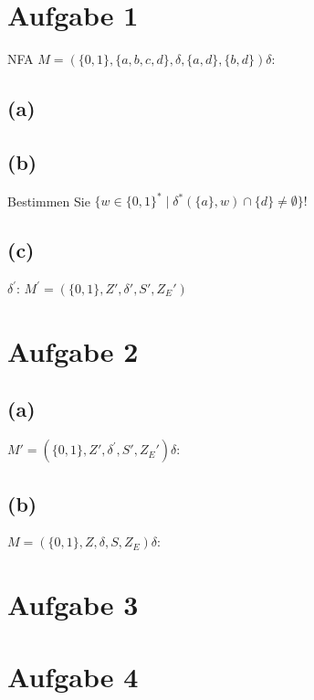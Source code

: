 \documentclass[titlepage]{article}
\renewcommand{\]}{\right]}
\renewcommand{\[}{\left[}
\renewcommand{\)}{\right)}
\renewcommand{\(}{\left(}
\renewcommand{\|}{\;|\;}
\renewcommand{\l}{\linebreak}
\begin{document}
\begingroup\let\clearpage\relax
	
	
	\section*{Aufgabe 1}
		\tab NFA $M=(\{0,1\},\{a,b,c,d\},\delta,\{a,d\},\{b,d\})$\tab$\delta$:\l
		\begin{center}
			
			
		\end{center}
		\subsection*{(a)}
			
			
		\subsection*{(b)}Bestimmen Sie $\{w\in\{0,1\}^*\mid\delta^*(\{a\},w)\cap\{d\}\neq\emptyset\}!$
			
			
		\subsection*{(c)}
		\begin{center}
			
			$\delta^{'}$:\l
			\l
			$M^{'}=(\{0,1\},Z',\delta',S',Z_E')$
		\end{center}
	\section*{Aufgabe 2}
	\subsection*{(a)}
		\tab$M'=(\{0,1\},Z',\delta^{'},S',Z_E')$\tab$\delta$:\\
		\begin{center}
			
			
		\end{center}
	\subsection*{(b)}
		\tab$M=(\{0,1\},Z,\delta,S,Z_E)$\tab$\delta$:\\
		\begin{center}
			
			
		\end{center}
	
	\pagebreak
	\section*{Aufgabe 3}
		\begin{center}
			
		\end{center}
	
	\section*{Aufgabe 4}
		\begin{center}
			
		\end{center}

	\endgroup	
\end{document}
